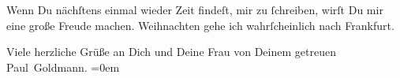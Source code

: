 \pstart
           Wenn Du nächſtens einmal wieder Zeit findeſt, mir zu{ }ſchreiben, wirſt Du mir eine
               große Freude machen. Weihnachten gehe ich
               wahrſcheinlich nach {\pb}Frankfurt.\pend
           
\pstart
           Viele herzliche Grüße an Dich und Deine Frau von Deinem getreuen {\\[\baselineskip]}\spacefill\mbox{Paul Goldmann.}\pend
           \leftskip=0em{}\endnumbering{}  \newcommand{\dateiname}{L03389}\newcommand{\titel}{Paul Goldmann an Arthur Schnitzler, 13. 12. [1903]}\newcommand{\editorInnen}{Martin Anton Müller und Laura Untner}

